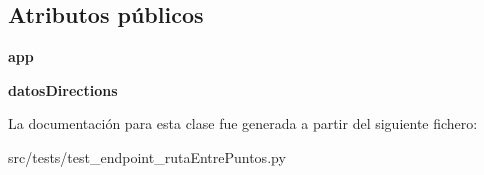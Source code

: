 \subsection*{Atributos públicos}
\begin{DoxyCompactItemize}
\item 
\hypertarget{classsrc_1_1tests_1_1test__endpoint__ruta_entre_puntos_1_1_test_endpoint_ruta_entre_puntos_a6eb2107e157f4cd6551a2a4efbbd7c87}{{\bfseries app}}\label{classsrc_1_1tests_1_1test__endpoint__ruta_entre_puntos_1_1_test_endpoint_ruta_entre_puntos_a6eb2107e157f4cd6551a2a4efbbd7c87}

\item 
\hypertarget{classsrc_1_1tests_1_1test__endpoint__ruta_entre_puntos_1_1_test_endpoint_ruta_entre_puntos_aa5ecabecd7e5cb5fb2e10d335708701f}{{\bfseries datos\-Directions}}\label{classsrc_1_1tests_1_1test__endpoint__ruta_entre_puntos_1_1_test_endpoint_ruta_entre_puntos_aa5ecabecd7e5cb5fb2e10d335708701f}

\end{DoxyCompactItemize}


La documentación para esta clase fue generada a partir del siguiente fichero\-:\begin{DoxyCompactItemize}
\item 
src/tests/test\-\_\-endpoint\-\_\-ruta\-Entre\-Puntos.\-py\end{DoxyCompactItemize}
